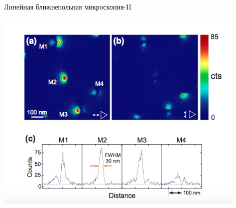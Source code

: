 \documentclass[9pt, compress, xcolor=table]{beamer}
\begin{document}
\begin{frame}{Линейная ближнепольная микроскопия-II}

\begin{center}
\includegraphics[width=0.9\textwidth]{tr5}
\end{center}


\end{frame}
\end{document}
